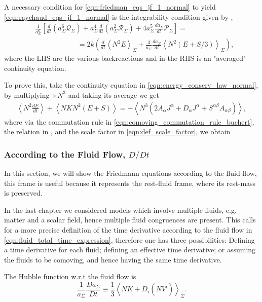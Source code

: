 A necessary condition for \cref{eqn:friedman_eqs_jf_1_normal} to yield \cref{eqn:raychaud_eqs_jf_1_normal} is the integrability condition given by \cite{Buchert_2020},
\begin{align}
&\frac{1}{a_\Sigma^6}\left[\frac{d}{d t}\left(a_\Sigma^6\mathcal{Q}_{\Sigma}\right)+a_\Sigma^4\frac{d}{dt}\left(a_\Sigma^2\mathcal{R}_{\Sigma}\right)+4a_\Sigma^5\frac{da_\Sigma}{dt}\mathcal{P}_{\Sigma}\right]=\nonumber \\
&\qquad\qquad\qquad =2k\left(\frac{d}{d t}\left\langle N^2 E\right\rangle_{\Sigma}+\frac{3}{a_{\Sigma}} \frac{d a_{\Sigma}}{d t}\left\langle N^2\left(E+S/3\right)\right\rangle_{\Sigma}\right),
\end{align}
where the LHS are the various backreactions and in the RHS is an "averaged" continuity equation. 

To prove this, take the continuity equation in \cref{eqn:energy_conserv_law_normal}, by multiplying $\times N^3$ and taking its average we get
\begin{align}
    \left\langle N^2\frac{d E}{dt}\right\rangle + \left\langle NK N^2(E+S)\right\rangle =  -\left\langle N^3\left( 2 A_\alpha J^\alpha +  D_\alpha J^\alpha+ S^{\alpha\beta}A_{\alpha\beta}\right)\right\rangle,
\end{align}
where via the commutation rule in \cref{eqn:comoving_commutation_rule_buchert}, the relation in , and the scale factor in \cref{eqn:def_scale_factor}, we obtain



\subsubsection{According to the Fluid Flow, $D/Dt$}

In this section, we will show the Friedmann equations according to the fluid flow, this frame is useful because it represents the rest-fluid frame, where its rest-mass is preserved.

In the last chapter we considered models which involve multiple fluids, e.g. matter and a scalar field, hence multiple fluid congruences are present.
This calls for a more precise definition of the time derivative according to the fluid flow in \cref{eqn:fluid_total_time_expression}, therefore one has three possibilities: Defining a time derivative for each fluid; defining an effective time derivative; or assuming the fluids to be comoving, and hence having the same time derivative.

The Hubble function w.r.t the fluid flow is
\begin{equation}
    \frac{1}{a_{\Sigma}}\frac{Da_{\Sigma}}{Dt}\equiv\frac{1}{3}\left\langle NK+D_i(NV^i) \right\rangle_{\Sigma}.
    \label{eqn:def_scale_factor_fluid}
\end{equation}

